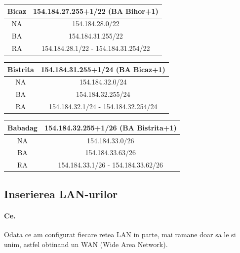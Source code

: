 \documentclass{article}
\begin{document}
\begin{center}
    \begin{tabular}{|c|c|}
    \hline 
        Bicaz & 154.184.27.255+1/22 (BA Bihor+1) \\
    \hline \hline
        NA & 154.184.28.0/22  \\
            \hline
        BA & 154.184.31.255/22\\
            \hline
        RA & 154.184.28.1/22 - 154.184.31.254/22 \\
            \hline
    \end{tabular}
\end{center}




\begin{center}
    \begin{tabular}{|c|c|}
    \hline 
        Bistrita & 154.184.31.255+1/24 (BA Bicaz+1) \\
        \hline \hline
        NA & 154.184.32.0/24  \\
            \hline
        BA & 154.184.32.255/24\\
            \hline
        RA & 154.184.32.1/24 - 154.184.32.254/24 \\
            \hline
    \end{tabular}
\end{center}




\begin{center}
    \begin{tabular}{|c|c|}
    \hline
        Babadag & 154.184.32.255+1/26 (BA Bistrita+1) \\
    \hline \hline
        NA & 154.184.33.0/26  \\
            \hline
        BA & 154.184.33.63/26\\
            \hline
        RA & 154.184.33.1/26 - 154.184.33.62/26 \\
            \hline
    \end{tabular}
\end{center}




\newpage

\subsection{Inserierea LAN-urilor}

\paragraph{Ce.}
Odata ce am configurat fiecare retea LAN in parte, mai ramane doar sa le si unim, astfel obtinand un WAN (Wide Area Network).
\end{document}
